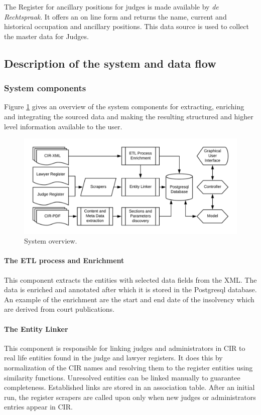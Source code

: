 The Register for ancillary positions for judges is made available by \textit{de Rechtspraak}\cite{rechtspraak:2}. It offers an on line form and returns the name, current and historical occupation and ancillary positions. This data source is used to collect the master data for Judges.


\subsection{Description of the system and data flow}
\subsubsection{System components}
Figure \ref{System overview} gives an overview of the system components for extracting, enriching and integrating the sourced data and making the resulting structured and higher level information available to the user.

\begin{figure}[h]
\includegraphics[width=1\linewidth]{system_overview.png}
\caption{System overview.}\label{System overview}
\end{figure}

\paragraph{The ETL process and Enrichment} This component extracts the entities with selected data fields from the XML. The data is enriched and annotated after which it is stored in the Postgresql database. An example of the enrichment are the start and end date of the insolvency which are derived from court publications.

\paragraph{The Entity Linker} This component is responsible for linking judges and administrators in CIR to real life entities found in the judge and lawyer registers. It does this by normalization of the CIR names and resolving them to the register entities using similarity functions. Unresolved entities can be linked manually to guarantee completeness. Established links are stored in an association table. After an initial run, the register scrapers are called upon only when new judges or administrators entries appear in CIR.

